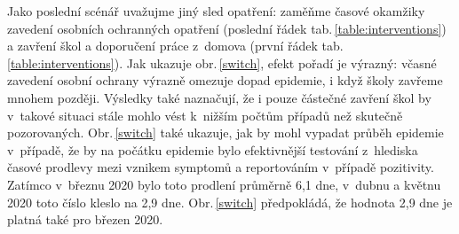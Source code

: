 Jako poslední scénář uvažujme jiný sled opatření: zaměňme časové okamžiky zavedení osobních ochranných opatření (poslední řádek tab.\,\ref{table:interventions}) a zavření škol a doporučení práce z~domova (první řádek tab.\,\ref{table:interventions}). Jak ukazuje obr.\,\ref{switch}, efekt pořadí je výrazný: včasné zavedení osobní ochrany výrazně omezuje dopad epidemie, i když školy zavřeme mnohem později. Výsledky také naznačují, že i pouze částečné zavření škol by v~takové situaci stále mohlo vést k~nižším počtům případů než skutečně pozorovaných. Obr.\,\ref{switch} také ukazuje, jak by mohl vypadat průběh epidemie v~případě, že by na počátku epidemie bylo efektivnější testování z~hlediska časové prodlevy mezi vznikem symptomů a reportováním v~případě pozitivity. Zatímco v~březnu 2020 bylo toto prodlení průměrně 6,1 dne, v~dubnu a květnu 2020 toto číslo kleslo na 2,9 dne. Obr.\,\ref{switch} předpokládá, že hodnota 2,9 dne je platná také pro březen 2020.


